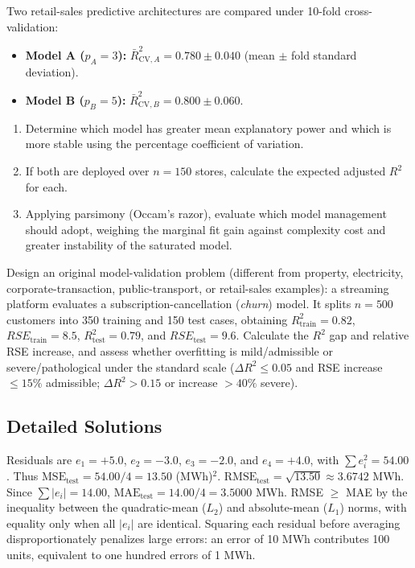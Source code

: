 \begin{problema}
\label{prob:2b2e597}
Two retail-sales predictive architectures are compared under 10-fold cross-validation:
\begin{itemize}
\item \textbf{Model A ($p_A=3$):} $\bar R^2_{\text{CV},A}=0.780\pm0.040$ (mean $\pm$ fold standard deviation).
\item \textbf{Model B ($p_B=5$):} $\bar R^2_{\text{CV},B}=0.800\pm0.060$.
\end{itemize}
\begin{enumerate}
\item Determine which model has greater mean explanatory power and which is more stable using the percentage coefficient of variation.
\item If both are deployed over $n=150$ stores, calculate the expected adjusted $R^2$ for each.
\item Applying parsimony (Occam's razor), evaluate which model management should adopt, weighing the marginal fit gain against complexity cost and greater instability of the saturated model.
\end{enumerate}
\end{problema}

\begin{problema}
\label{prob:9689172}
Design an original model-validation problem (different from property, electricity, corporate-transaction, public-transport, or retail-sales examples): a streaming platform evaluates a subscription-cancellation (\emph{churn}) model. It splits $n=500$ customers into 350 training and 150 test cases, obtaining $R^2_{\text{train}}=0.82$, $RSE_{\text{train}}=8.5$, $R^2_{\text{test}}=0.79$, and $RSE_{\text{test}}=9.6$. Calculate the $R^2$ gap and relative RSE increase, and assess whether overfitting is mild/admissible or severe/pathological under the standard scale ($\Delta R^2\le0.05$ and RSE increase $\le15\%$ admissible; $\Delta R^2>0.15$ or increase $>40\%$ severe).
\end{problema}

\subsection*{Detailed Solutions}

\begin{solproblema}[prob:ca86634]
Residuals are $e_1=+5.0$, $e_2=-3.0$, $e_3=-2.0$, and $e_4=+4.0$, with $\sum e_i^2=54.00$. Thus $\text{MSE}_{\text{test}}=54.00/4=13.50$ (MWh)$^2$. $\text{RMSE}_{\text{test}}=\sqrt{13.50}\approx3.6742$ MWh. Since $\sum|e_i|=14.00$, $\text{MAE}_{\text{test}}=14.00/4=3.5000$ MWh. RMSE $\ge$ MAE by the inequality between the quadratic-mean ($L_2$) and absolute-mean ($L_1$) norms, with equality only when all $|e_i|$ are identical. Squaring each residual before averaging disproportionately penalizes large errors: an error of 10 MWh contributes 100 units, equivalent to one hundred errors of 1 MWh.
\end{solproblema}

